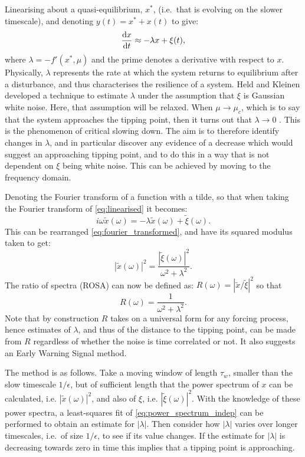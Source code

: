 Linearising about a quasi-equilibrium, $x^*$, (i.e.\ that is evolving on the slower timescale), and denoting
$y(t) = x^* + x(t)$ to give:
\begin{equation}
  \label{eq:linearised}
  \dv{x}{t} \approx -\lambda x + \xi(t),
\end{equation}
where $\lambda = -f'(x^*,\mu)$ and the prime denotes a derivative with respect to $x$. 
Physically, $\lambda$ represents the rate at which the system returns to equilibrium after
a disturbance, and thus characterises the resilience of a system. Held and Kleinen \parencite{Held2004} developed a technique to estimate $\lambda$
under the assumption that $\xi$ is Gaussian white noise. Here, 
that assumption will be relaxed.
When $\mu \rightarrow \mu_c$, which is to say that the system approaches
the tipping point, then it turns out that $\lambda \rightarrow 0$ \parencite{guckenheimer2013}. This is the phenomenon of critical slowing down. The aim is to therefore
identify changes in $\lambda$, and in particular discover any evidence of a decrease which would suggest an approaching tipping point, and
to do this in a way that is not dependent on $\xi$ being white noise. This can be achieved by moving to the frequency domain.

Denoting the Fourier transform of a function with a tilde, so that when taking the Fourier transform of \cref{eq:linearised} it becomes:
\begin{equation}
  \label{eq:fourier_transformed}
  i\omega \tilde{x}(\omega) = -\lambda \tilde{x}(\omega) + \tilde{\xi}(\omega).
\end{equation}
This can be rearranged \cref{eq:fourier_transformed}, and have its squared modulus taken to get:
\begin{equation}
  \label{eq:power_spectra}
  |\tilde{x}(\omega)|^2 = \frac{|\tilde{\xi}(\omega)|^2}{\omega^2 + \lambda^2}.
\end{equation}
The ratio of spectra (ROSA) can now be defined as:
$R(\omega) = |\tilde{x}/\tilde{\xi}|^2$ so that
\begin{equation}
    \label{eq:power_spectrum_indep}
    R(\omega) = \frac{1}{\omega^2 + \lambda^2}.
\end{equation}
Note that by construction $R$ takes on a universal form for any 
forcing process,
hence estimates of $\lambda$, and thus of the 
distance to the tipping point, can be made from $R$ regardless 
of whether the noise is time correlated or not. It also suggests an
Early Warning Signal method.

The method is as follows.
Take a moving window of length $\tau_w$, smaller than the slow timescale $1/\epsilon$, but of sufficient
length that the power spectrum of $x$ can be calculated, i.e. $|\tilde{x}(\omega)|^2$, and also of
$\xi$, i.e. $|\tilde{\xi}(\omega)|^2$. With the knowledge of these power spectra, a least-squares
fit of \cref{eq:power_spectrum_indep} can be performed to obtain an estimate for $|\lambda|$.  Then consider how $|\lambda|$ varies over longer timescales, i.e.\ of
size $1/\epsilon$, to see if its value changes. 
If the estimate for $|\lambda|$ is decreasing towards zero in time this implies that a tipping point is approaching. 

